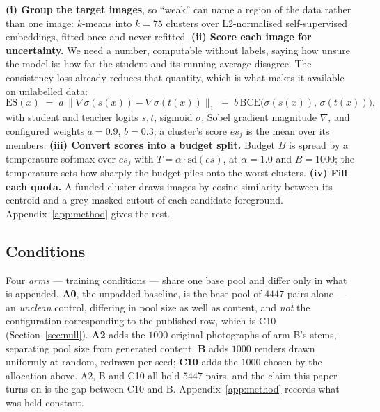 \documentclass{article} %
\begin{document}
\textbf{(i) Group the target images}, so ``weak'' can name a region of the data rather than one
image: $k$-means into $k=75$ clusters over L2-normalised self-supervised embeddings, fitted once and
never refitted. \textbf{(ii) Score each image for uncertainty.} We need a number, computable without
labels, saying how unsure the model is: how far the student and its running average disagree. The
consistency loss already reduces that quantity, which is what makes it available on unlabelled
data:
\begin{equation}
\mathrm{ES}(x) \;=\; a \,\big\| \nabla \sigma(s(x)) - \nabla \sigma(t(x)) \big\|_{1}
\;+\; b \, \mathrm{BCE}\big( \sigma(s(x)),\, \sigma(t(x)) \big),
\label{eq:es}
\end{equation}
with student and teacher logits $s,t$, sigmoid $\sigma$, Sobel gradient magnitude $\nabla$, and
configured weights $a=0.9$, $b=0.3$; a cluster's score $\mathit{es}_j$ is the mean over its
members. \textbf{(iii) Convert scores into a budget split.} Budget $B$ is spread by a temperature
softmax over $\mathit{es}_j$ with $T = \alpha \cdot \mathrm{sd}(\mathit{es})$, at $\alpha = 1.0$ and
$B = 1000$; the temperature sets how sharply the budget piles onto the worst clusters.
\textbf{(iv) Fill each quota.} A funded cluster draws images by cosine similarity between its
centroid and a grey-masked cutout of each candidate foreground. Appendix~\ref{app:method} gives the
rest.

\subsection{Conditions}
\label{sec:method-arms}

Four \emph{arms} --- training conditions --- share one base pool and differ only in what is
appended. \textbf{A0}, the unpadded baseline, is the base pool of $4447$ pairs alone --- an
\emph{unclean} control, differing in pool size as well as content, and \emph{not} the configuration
corresponding to the published row, which is C10 (Section~\ref{sec:null}). \textbf{A2} adds the $1000$ original photographs of arm B's stems, separating pool size from
generated content. \textbf{B} adds $1000$ renders drawn uniformly at random, redrawn per seed;
\textbf{C10} adds the $1000$ chosen by the allocation above. A2, B and C10 all hold $5447$ pairs, and the claim this paper
turns on is the gap between C10 and B. Appendix~\ref{app:method} records what was held constant.

\end{document}
